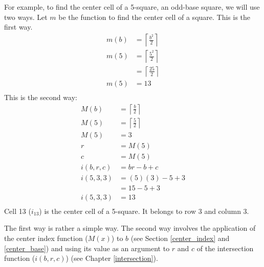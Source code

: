 \documentclass[letterpaper, twoside,12pt]{article}
\begin{document}
    For example, to find the center cell of a 5-square, an odd-base square, we will use two ways. Let $m$ be the function to find the center cell of a square. This is the first way.
    \begin{equation}
        \begin{split}
            m(b) &= \left\lceil \frac{b^2}{2} \right\rceil \\
            m(5) &= \left\lceil \frac{5^2}{2} \right\rceil \\
                &= \left\lceil \frac{25}{2} \right\rceil \\
            m(5) &= 13 \\
        \end{split}
    \end{equation}
    This is the second way:
    \begin{equation}
        \begin{split}
            M(b) &= \left\lceil \frac{b}{2} \right\rceil \\
            M(5) &= \left\lceil \frac{5}{2} \right\rceil \\
            M(5) &= 3 \\
            r &= M(5) \\
            c &= M(5) \\
            i(b,r,c) &= br - b + c \\
            i(5,3,3) &= (5)(3) - 5 + 3 \\
                &= 15 - 5 + 3 \\
            i(5,3,3) &= 13 \\
        \end{split}
    \end{equation}
    Cell 13 ($i_{13}$) is the center cell of a 5-square. It belongs to row 3 and column 3.

    \newpage

    The first way is rather a simple way. The second way involves the application of the center index function ($M(x)$) to $b$ (see Section \ref{center_index} and \ref{center_base}) and using its value as an argument to $r$ and $c$ of the intersection function ($i(b,r,c)$) (see Chapter \ref{intersection}).
\end{document}
